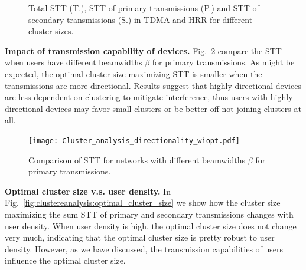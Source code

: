 \documentclass[10pt, conference, letterpaper]{IEEEtran}
\begin{document}
\begin{figure}[htp]
	\centering
	 \hfill
	
	\caption[]{Total STT (T.), STT of primary transmissions (P.) and STT of secondary transmissions (S.) in TDMA %
		and HRR %
		 for different cluster sizes. }
	\label{fig:cluster:validation}
\end{figure}


	

\textbf{Impact of transmission capability of devices.} Fig.~\ref{fig:cluster:directionality} compare the STT when users have different beamwidths $\beta$ for primary transmissions.
As might be expected, the optimal cluster size maximizing STT is smaller when the transmissions are more directional. 
Results suggest that highly directional devices are less dependent on clustering to mitigate interference, thus users with highly directional devices may favor small clusters or be better off not joining clusters at all. 


\begin{figure}
	\centering
	\texttt{[image: Cluster\_analysis\_directionality\_wiopt.pdf]}
	\caption{Comparison of STT for networks with different beamwidths $\beta$ for primary transmissions.}
	\label{fig:cluster:directionality}
\end{figure}

\textbf{Optimal cluster size v.s. user density.} In Fig.~\ref{fig:clustereanalysis:optimal_cluster_size} we show how the cluster size maximizing the sum STT of primary and secondary transmissions changes with user density. 
When user density is high, the optimal cluster size does not change very much, indicating that the optimal cluster size is pretty robust to user density. 
However, as we have discussed, the transmission capabilities of users influence the optimal cluster size. 
\end{document}
